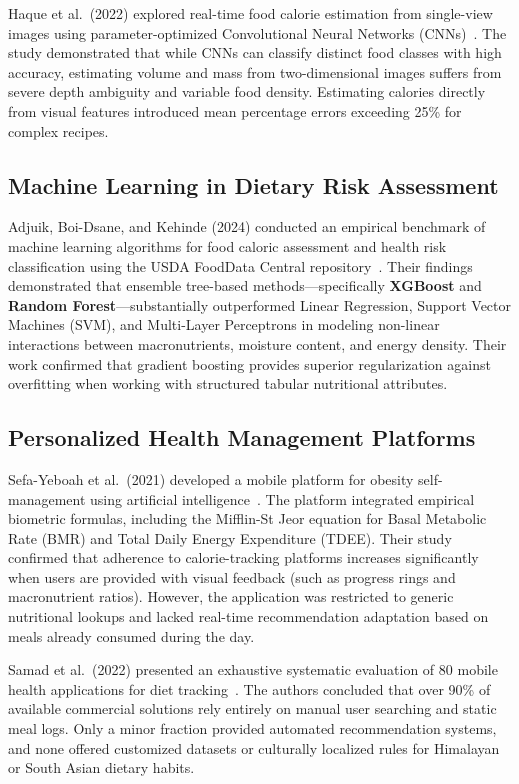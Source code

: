 \documentclass[12pt,a4paper]{report}
\begin{document}
Haque et al.\ (2022) explored real-time food calorie estimation from single-view images using parameter-optimized Convolutional Neural Networks (CNNs)~\cite{haque2022}. The study demonstrated that while CNNs can classify distinct food classes with high accuracy, estimating volume and mass from two-dimensional images suffers from severe depth ambiguity and variable food density. Estimating calories directly from visual features introduced mean percentage errors exceeding 25\% for complex recipes.

\subsection{Machine Learning in Dietary Risk Assessment}
Adjuik, Boi-Dsane, and Kehinde (2024) conducted an empirical benchmark of machine learning algorithms for food caloric assessment and health risk classification using the USDA FoodData Central repository~\cite{adjuik2024}. Their findings demonstrated that ensemble tree-based methods---specifically \textbf{XGBoost} and \textbf{Random Forest}---substantially outperformed Linear Regression, Support Vector Machines (SVM), and Multi-Layer Perceptrons in modeling non-linear interactions between macronutrients, moisture content, and energy density. Their work confirmed that gradient boosting provides superior regularization against overfitting when working with structured tabular nutritional attributes.

\subsection{Personalized Health Management Platforms}
Sefa-Yeboah et al.\ (2021) developed a mobile platform for obesity self-management using artificial intelligence~\cite{sefayeboah2021}. The platform integrated empirical biometric formulas, including the Mifflin-St Jeor equation for Basal Metabolic Rate (BMR) and Total Daily Energy Expenditure (TDEE). Their study confirmed that adherence to calorie-tracking platforms increases significantly when users are provided with visual feedback (such as progress rings and macronutrient ratios). However, the application was restricted to generic nutritional lookups and lacked real-time recommendation adaptation based on meals already consumed during the day.

Samad et al.\ (2022) presented an exhaustive systematic evaluation of 80 mobile health applications for diet tracking~\cite{samad2022}. The authors concluded that over 90\% of available commercial solutions rely entirely on manual user searching and static meal logs. Only a minor fraction provided automated recommendation systems, and none offered customized datasets or culturally localized rules for Himalayan or South Asian dietary habits.
\end{document}
